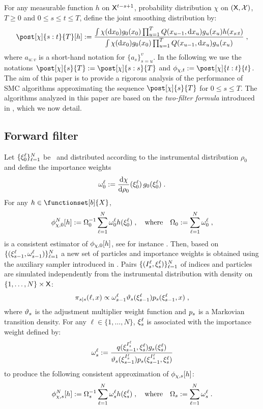 \label{sec:TwoFilters}
For any measurable function $h$ on $\mathsf{X}^{t-s+1}$, probability distribution $\chi$ on $(\mathsf{X},\mathcal{X})$, $T\geq 0$ and $0 \leq s \leq t \leq T$, define the joint smoothing distribution by:
\begin{equation}
\label{eq:smooth}
\post[\Xinit]{s:t}{T}[h] \eqdef \frac{\int \chi(\rmd x_0)g_{0}(x_0)\prod_{u=1}^{T}Q(x_{u-1},\rmd x_u)g_{u}(x_u)h(x_{s:t})}{\int \chi(\rmd x_0)g_{0}(x_0)\prod_{u=1}^{T}Q(x_{u-1},\rmd x_u)g_{u}(x_u)}\eqsp,
\end{equation}
where  $a_{u:v}$ is a short-hand notation for $\{a_s\}_{s=u}^{v}$. In the following we use the notations $\post[\Xinit]{s}{T}\eqdef \post[\Xinit]{s:s}{T}$ and $\filt{\Xinit,t}\eqdef \post[\Xinit]{t:t}{t}$. The aim of this paper is to provide a rigorous analysis of the performance of SMC algorithms approximating the sequence $\post[\Xinit]{s}{T}$ for $0\le s\le T$. The algorithms analyzed in this paper are based on the {\em two-filter formula} introduced in \cite{briers:doucet:maskell:2010,fearnhead:wyncoll:tawn:2010}, which we now detail.
\subsection{Forward filter}
Let $\{\xi_{0}^{\ell}\}_{\ell = 1}^N$ be \iid\ and  distributed according to the instrumental distribution $\rho_0$ and define the importance weights
\[
\ewght{0}{\ell} \eqdef \frac{\rmd \Xinit}{\rmd \XinitIS{0}}(\epart{0}{\ell}) \, g_{0}(\epart{0}{\ell})\eqsp.
\]
For any  $h\in \functionset[b]{X}$,
\[
\filt{\Xinit,0}^N[h]\eqdef \sumwght{0}^{-1}\sum_{\ell=1}^N \ewght{0}{\ell}h(\epart{0}{\ell})\eqsp,\quad\mbox{where}\quad\sumwght{0}\eqdef \sum_{\ell=1}^N \ewght{0}{\ell}\eqsp,
\]
is a consistent estimator of $\filt{\Xinit,0}[h]$, see for instance \cite{delmoral:2004}. Then, based on $\{(\xi_{s-1}^{\ell},\omega_{s-1}^{\ell})\}_{\ell=1}^N$ a new set of particles and importance weights is obtained using the auxiliary sampler introduced in \cite{pitt:shephard:1999}. Pairs $\{ (I_s^{\ell}, \xi_{s}^{\ell}) \}_{\ell = 1}^N$ of indices and particles are simulated independently from the instrumental distribution with density on $\{1, \dots, N\} \times \mathsf{X}$:
\begin{equation} 
\label{eq:instrumental-distribution-filtering}
\instrpostaux{s}{s}(\ell,x) \propto \ewght{s-1}{\ell} \adjfuncforward{s}(\epart{s-1}{\ell}) \kissforward{s}{s}(\epart{s-1}{\ell},x) \eqsp,
\end{equation}
where $\vartheta_{s}$ is the adjustment multiplier weight function and $\kissforward{s}{s}$ is a Markovian transition density. For any  $\ell \in\{1, \dots, N\}$, $\xi_{s}^{\ell}$ is associated with the  importance weight defined by:
\begin{equation}
\label{eq:weight-update-filtering}
    \ewght{s}{\ell} \eqdef \frac{q(\epart{s-1}{I_s^{\ell}},\epart{s}{\ell}) g_{s}(\epart{s}{\ell})}{\adjfuncforward{s}(\epart{s-1}{I_s^{\ell}}) \kissforward{s}{s}(\epart{s-1}{I_s^{\ell}},\epart{s}{\ell})}
\end{equation}
to produce the following consistent approximation of $\filt{\Xinit,s}[h]$:
\[
\filt{\Xinit,s}^N[h]\eqdef \sumwght{s}^{-1}\sum_{\ell=1}^N \ewght{s}{\ell}h(\epart{s}{\ell})\eqsp,\quad \mbox{where}\quad \sumwght{s}\eqdef \sum_{\ell=1}^N \ewght{s}{\ell}\eqsp.
\]
